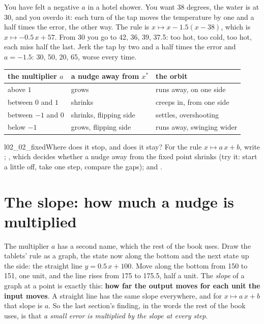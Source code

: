 You have felt a negative $a$ in a hotel shower. You want 38 degrees, the
water is at 30, and you overdo it: each turn of the tap moves the
temperature by one and a half times the error, the other way. The rule is
$x \mapsto x - \num{1.5}(x - 38)$, which is $x \mapsto \num{-0.5}\,x + 57$.
From 30 you go to 42, 36, 39, \num{37.5}: too hot, too cold, too hot, each
miss half the last. Jerk the tap by two and a half times the error and $a =
\num{-1.5}$: 30, 50, 20, 65, worse every time.

\begin{center}
\begin{tabularx}{\linewidth}{@{}lXX@{}}
\toprule
the multiplier $a$ & a nudge away from $x^{*}$ & the orbit \\
\midrule
above $1$ & grows & runs away, on one side \\
between $0$ and $1$ & shrinks & creeps in, from one side \\
between $-1$ and $0$ & shrinks, flipping side & settles, overshooting \\
below $-1$ & grows, flipping side & runs away, swinging wider \\
\bottomrule
\end{tabularx}
\end{center}

\begin{lab}{l02_02_fixed}{Where does it stop, and does it stay?}
For the rule $x \mapsto a\,x + b$, write ;
, which decides whether a nudge away from the fixed point
shrinks (try it: start a little off, take one step, compare the gaps); and
.
\end{lab}

\section{The slope: how much a nudge is multiplied}
\label{sec:ch02-slope}

\noindent
The multiplier $a$ has a second name, which the rest of the book uses. Draw
the tablets' rule as a graph, the state now along the bottom and the next
state up the side: the straight line $y = \num{0.5}\,x + 100$. Move along
the bottom from 150 to 151, one unit, and the line rises from 175 to
\num{175.5}, half a unit. The \emph{slope} of a graph at a point is exactly
this: \textbf{how far the output moves for each unit the input moves}. A
straight line has the same slope everywhere, and for $x \mapsto a\,x + b$
that slope is $a$. So the last section's finding, in the words the rest of
the book uses, is that \emph{a small error is multiplied by the slope at
every step}.

